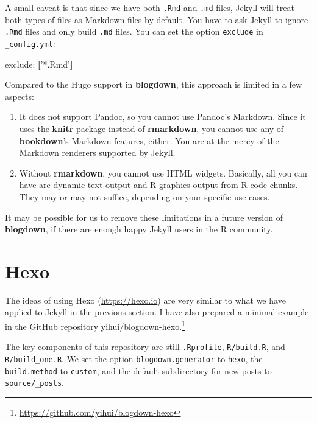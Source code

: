 \documentclass[12pt,]{krantz}
\makeatletter
\newenvironment{Shaded}{\begin{snugshade}}{\end{snugshade}}
\newcommand{\AttributeTok}[1]{\textcolor[rgb]{0.77,0.63,0.00}{#1}}
\newcommand{\FunctionTok}[1]{\textcolor[rgb]{0.00,0.00,0.00}{#1}}
\newcommand{\KeywordTok}[1]{\textcolor[rgb]{0.13,0.29,0.53}{\textbf{#1}}}
\newcommand{\StringTok}[1]{\textcolor[rgb]{0.31,0.60,0.02}{#1}}
\renewcommand{\href}[2]{#2\footnote{\url{#1}}}
\newenvironment{kframe}{%
\medskip{}
\setlength{\fboxsep}{.8em}
 \def\at@end@of@kframe{}%
 \ifinner\ifhmode%
  \def\at@end@of@kframe{\end{minipage}}%
  \begin{minipage}{\columnwidth}%
 \fi\fi%
 \def\FrameCommand##1{\hskip\@totalleftmargin \hskip-\fboxsep
 \colorbox{shadecolor}{##1}\hskip-\fboxsep
     \hskip-\linewidth \hskip-\@totalleftmargin \hskip\columnwidth}%
 \MakeFramed {\advance\hsize-\width
   \@totalleftmargin\z@ \linewidth\hsize
   \@setminipage}}%
 {\par\unskip\endMakeFramed%
 \at@end@of@kframe}
\renewenvironment{Shaded}{\begin{kframe}}{\end{kframe}}
\theoremstyle{definition}
\theoremstyle{definition}
\theoremstyle{definition}
\theoremstyle{remark}
\makeatother
\begin{document}
A small caveat is that since we have both \texttt{.Rmd} and \texttt{.md}
files, Jekyll will treat both types of files as Markdown files by
default. You have to ask Jekyll to ignore \texttt{.Rmd} files and only
build \texttt{.md} files. You can set the option \texttt{exclude} in
\texttt{\_config.yml}:

\begin{Shaded}
\begin{Highlighting}[]
\FunctionTok{exclude:}\AttributeTok{ }\KeywordTok{[}\StringTok{'*.Rmd'}\KeywordTok{]}
\end{Highlighting}
\end{Shaded}

Compared to the Hugo support in \textbf{blogdown}, this approach is
limited in a few aspects:

\begin{enumerate}
\def\labelenumi{\arabic{enumi}.}
\item
  It does not support Pandoc, so you cannot use Pandoc's Markdown. Since
  it uses the \textbf{knitr} package instead of \textbf{rmarkdown}, you
  cannot use any of \textbf{bookdown}'s Markdown features, either. You
  are at the mercy of the Markdown renderers supported by Jekyll.
\item
  Without \textbf{rmarkdown}, you cannot use HTML widgets. Basically,
  all you can have are dynamic text output and R graphics output from R
  code chunks. They may or may not suffice, depending on your specific
  use cases.
\end{enumerate}

It may be possible for us to remove these limitations in a future
version of \textbf{blogdown}, if there are enough happy Jekyll users in
the R community.

\hypertarget{hexo}{%
\section{Hexo}\label{hexo}}

The ideas of using Hexo (\url{https://hexo.io}) are very
similar to what we have applied to Jekyll in the previous section. I
have also prepared a minimal example in the GitHub repository
\href{https://github.com/yihui/blogdown-hexo}{yihui/blogdown-hexo.}

The key components of this repository are still \texttt{.Rprofile},
\texttt{R/build.R}, and \texttt{R/build\_one.R}. We set the option
\texttt{blogdown.generator} to \texttt{hexo}, the \texttt{build.method}
to \texttt{custom}, and the default subdirectory for new posts to
\texttt{source/\_posts}.
\end{document}
